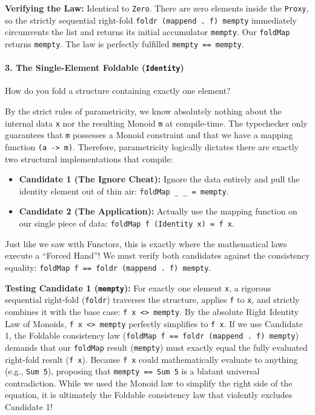 \documentclass[
]{article}
\providecommand{\tightlist}{%
  \setlength{\itemsep}{0pt}\setlength{\parskip}{0pt}}
\begin{document}
\textbf{Verifying the Law:} Identical to \texttt{Zero}. There are zero
elements inside the \texttt{Proxy}, so the strictly sequential
right-fold \texttt{foldr\ (mappend\ .\ f)\ mempty} immediately
circumvents the list and returns its initial accumulator
\texttt{mempty}. Our \texttt{foldMap} returns \texttt{mempty}. The law
is perfectly fulfilled \texttt{mempty\ ==\ mempty}.

\paragraph{\texorpdfstring{3. The Single-Element Foldable
(\texttt{Identity})}{3. The Single-Element Foldable (Identity)}}\label{the-single-element-foldable-identity}

How do you fold a structure containing exactly one element?

By the strict rules of parametricity, we know absolutely nothing about
the internal data \texttt{x} nor the resulting Monoid \texttt{m} at
compile-time. The typechecker only guarantees that \texttt{m} possesses
a Monoid constraint and that we have a mapping function
\texttt{(a\ -\textgreater{}\ m)}. Therefore, parametricity logically
dictates there are exactly two structural implementations that compile:

\begin{itemize}
\tightlist
\item
  \textbf{Candidate 1 (The Ignore Cheat):} Ignore the data entirely and
  pull the identity element out of thin air:
  \texttt{foldMap\ \_\ \_\ =\ mempty}.
\item
  \textbf{Candidate 2 (The Application):} Actually use the mapping
  function on our single piece of data:
  \texttt{foldMap\ f\ (Identity\ x)\ =\ f\ x}.
\end{itemize}

Just like we saw with Functors, this is exactly where the mathematical
laws execute a ``Forced Hand''! We must verify both candidates against
the consistency equality:
\texttt{foldMap\ f\ ==\ foldr\ (mappend\ .\ f)\ mempty}.

\textbf{Testing Candidate 1 (\texttt{mempty}):} For exactly one element
\texttt{x}, a rigorous sequential right-fold (\texttt{foldr}) traverses
the structure, applies \texttt{f} to \texttt{x}, and strictly combines
it with the base case: \texttt{f\ x\ \textless{}\textgreater{}\ mempty}.
By the absolute Right Identity Law of Monoids,
\texttt{f\ x\ \textless{}\textgreater{}\ mempty} perfectly simplifies to
\texttt{f\ x}. If we use Candidate 1, the Foldable consistency law
(\texttt{foldMap\ f\ ==\ foldr\ (mappend\ .\ f)\ mempty}) demands that
our \texttt{foldMap} result (\texttt{mempty}) must exactly equal the
fully evaluated right-fold result (\texttt{f\ x}). Because \texttt{f\ x}
could mathematically evaluate to anything (e.g., \texttt{Sum\ 5}),
proposing that \texttt{mempty\ ==\ Sum\ 5} is a blatant universal
contradiction. While we used the Monoid law to simplify the right side
of the equation, it is ultimately the Foldable consistency law that
violently excludes Candidate 1!
\end{document}
